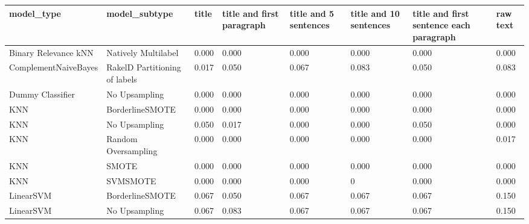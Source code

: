 \begin{tabular}{llllllll}
\toprule
                     model\_type &                 model\_subtype & title & title and first paragraph & title and 5 sentences & title and 10 sentences & title and first sentence each paragraph & raw text \\
\midrule
           Binary Relevance kNN &           Natively Multilabel & 0.000 &                     0.000 &                 0.000 &                  0.000 &                                   0.000 &    0.000 \\
           ComplementNaiveBayes & RakelD Partitioning of labels & 0.017 &                     0.050 &                 0.067 &                  0.083 &                                   0.050 &    0.083 \\
               Dummy Classifier &                 No Upsampling & 0.000 &                     0.000 &                 0.000 &                  0.000 &                                   0.000 &    0.000 \\
                            KNN &               BorderlineSMOTE & 0.000 &                     0.000 &                 0.000 &                  0.000 &                                   0.000 &    0.000 \\
                            KNN &                 No Upsampling & 0.050 &                     0.017 &                 0.000 &                  0.000 &                                   0.050 &    0.000 \\
                            KNN &           Random Oversampling & 0.000 &                     0.000 &                 0.000 &                  0.000 &                                   0.000 &    0.017 \\
                            KNN &                         SMOTE & 0.000 &                     0.000 &                 0.000 &                  0.000 &                                   0.000 &    0.000 \\
                            KNN &                      SVMSMOTE & 0.000 &                     0.000 &                 0.000 &                      0 &                                   0.000 &    0.000 \\
                      LinearSVM &               BorderlineSMOTE & 0.067 &                     0.050 &                 0.067 &                  0.067 &                                   0.067 &    0.150 \\
                      LinearSVM &                 No Upsampling & 0.067 &                     0.083 &                 0.067 &                  0.067 &                                   0.067 &    0.150 \\

\end{tabular}

